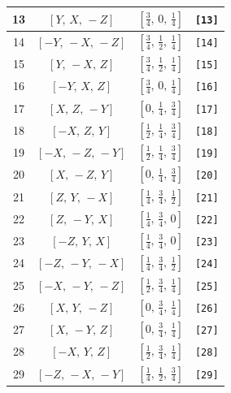 \documentclass[fleqn,8pt]{jsarticle}
\begin{document}
\begin{longtable}{cccc}
13 & $\left[ Y,\, X,\, - Z \right]$ & $\left[ \frac{3}{4},\, 0,\, \frac{1}{4} \right]$ & {\tt [13]} \\ \hline
14 & $\left[ - Y,\, - X,\, - Z \right]$ & $\left[ \frac{3}{4},\, \frac{1}{2},\, \frac{1}{4} \right]$ & {\tt [14]} \\ \hline
15 & $\left[ Y,\, - X,\, Z \right]$ & $\left[ \frac{3}{4},\, \frac{1}{2},\, \frac{1}{4} \right]$ & {\tt [15]} \\ \hline
16 & $\left[ - Y,\, X,\, Z \right]$ & $\left[ \frac{3}{4},\, 0,\, \frac{1}{4} \right]$ & {\tt [16]} \\ \hline
17 & $\left[ X,\, Z,\, - Y \right]$ & $\left[ 0,\, \frac{1}{4},\, \frac{3}{4} \right]$ & {\tt [17]} \\ \hline
18 & $\left[ - X,\, Z,\, Y \right]$ & $\left[ \frac{1}{2},\, \frac{1}{4},\, \frac{3}{4} \right]$ & {\tt [18]} \\ \hline
19 & $\left[ - X,\, - Z,\, - Y \right]$ & $\left[ \frac{1}{2},\, \frac{1}{4},\, \frac{3}{4} \right]$ & {\tt [19]} \\ \hline
20 & $\left[ X,\, - Z,\, Y \right]$ & $\left[ 0,\, \frac{1}{4},\, \frac{3}{4} \right]$ & {\tt [20]} \\ \hline
21 & $\left[ Z,\, Y,\, - X \right]$ & $\left[ \frac{1}{4},\, \frac{3}{4},\, \frac{1}{2} \right]$ & {\tt [21]} \\ \hline
22 & $\left[ Z,\, - Y,\, X \right]$ & $\left[ \frac{1}{4},\, \frac{3}{4},\, 0 \right]$ & {\tt [22]} \\ \hline
23 & $\left[ - Z,\, Y,\, X \right]$ & $\left[ \frac{1}{4},\, \frac{3}{4},\, 0 \right]$ & {\tt [23]} \\ \hline
24 & $\left[ - Z,\, - Y,\, - X \right]$ & $\left[ \frac{1}{4},\, \frac{3}{4},\, \frac{1}{2} \right]$ & {\tt [24]} \\ \hline
25 & $\left[ - X,\, - Y,\, - Z \right]$ & $\left[ \frac{1}{2},\, \frac{3}{4},\, \frac{1}{4} \right]$ & {\tt [25]} \\ \hline
26 & $\left[ X,\, Y,\, - Z \right]$ & $\left[ 0,\, \frac{3}{4},\, \frac{1}{4} \right]$ & {\tt [26]} \\ \hline
27 & $\left[ X,\, - Y,\, Z \right]$ & $\left[ 0,\, \frac{3}{4},\, \frac{1}{4} \right]$ & {\tt [27]} \\ \hline
28 & $\left[ - X,\, Y,\, Z \right]$ & $\left[ \frac{1}{2},\, \frac{3}{4},\, \frac{1}{4} \right]$ & {\tt [28]} \\ \hline
29 & $\left[ - Z,\, - X,\, - Y \right]$ & $\left[ \frac{1}{4},\, \frac{1}{2},\, \frac{3}{4} \right]$ & {\tt [29]} \\ \hline

\end{longtable}
\end{document}
